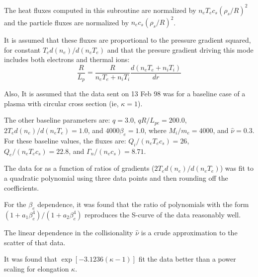 	The heat fluxes computed in this subroutine are normalized by
$ n_e T_e c_s ( \rho_s / R )^2 $ and the particle fluxes are
normalized by $ n_e c_s ( \rho_s / R )^2 $.

	It is assumed that these fluxes are
proportional to the pressure
gradient squared, for constant $ T_e d ( n_e ) / d ( n_e T_e ) $
and that the presure gradient driving this mode includes
both electrons and thermal ions:
\[ \frac{ R }{ L_p } = \frac{ R }{ n_e T_e + n_i T_i }
  \frac{ d ( n_e T_e + n_i T_i ) }{ d r } \]

	Also, It is assumed that the data sent on 13 Feb 98 was
for a baseline case of a plasma with circular cross section
(ie, $ \kappa = 1 $).

	The other baseline parameters are:  $ q = 3.0 $,
$ q R / L_{pe} = 200.0 $, $ 2 T_e d ( n_e ) / d ( n_e T_e ) = 1.0 $,
and $ 4000 \beta_e = 1.0 $, where $ M_i / m_e = 4000 $, 
and $ \hat{\nu} = 0.3 $.
For these baseline values, the fluxes are:
$ Q_i / ( n_e T_e c_s ) = 26 $,
$ Q_e / ( n_e T_e c_s ) = 22.8 $, and
$ \Gamma_n / ( n_e c_s ) = 8.71$.

	The data for as a function of ratios of gradients
($ 2 T_e d ( n_e ) / d ( n_e T_e ) $) was fit to a quadratic
polynomial using three data points and then rounding off the
coefficients.

	For the $ \beta_e $ dependence, it was found that the ratio
of polynomials with the form
$ ( 1 + a_1 \beta_e^4 ) / ( 1 + a_2 \beta_e^4 ) $
reproduces the S-curve of the data reasonably well.

	The linear dependence in the collisionality $ \hat{ \nu } $ 
is a crude approximation to the scatter of that data.

	It was found that $ \exp [ -3.1236 ( \kappa - 1 ) ] $
fit the data better than a power scaling for elongation $ \kappa $.


